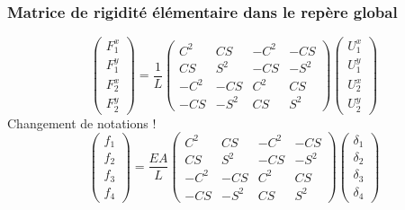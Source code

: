 \documentclass{beamer}
\begin{document}
\begin{frame}
\frametitle{Matrice de rigidité élémentaire dans le repère global}
\[\left(\begin{array}{l} 
F_{1}^x\\F_{1}^y\\F_{2}^x\\F_{2}^y
\end{array}\right)   = \frac{1}{L}\left(\begin{array}{rrrr} 
C^2&CS&-C^2&-CS\\
CS&S^2&-CS&-S^2\\
-C^2&-CS&C^2&CS\\
-CS&-S^2&CS&S^2
\end{array}\right)\left(\begin{array}{l} 
U_{1}^x\\U_{1}^y\\U_{2}^x\\U_{2}^y
\end{array}\right)  \]
Changement de notations !
\[\left(\begin{array}{l} 
f_{1}\\f_{2}\\f_{3}\\f_{4}
\end{array}\right)   = \frac{EA}{L}\left(\begin{array}{rrrr} 
C^2&CS&-C^2&-CS\\
CS&S^2&-CS&-S^2\\
-C^2&-CS&C^2&CS\\
-CS&-S^2&CS&S^2
\end{array}\right)\left(\begin{array}{l} 
\delta_{1}\\\delta_{2}\\\delta_{3}\\\delta_{4}
\end{array}\right)  \]
\end{frame}
\end{document}
